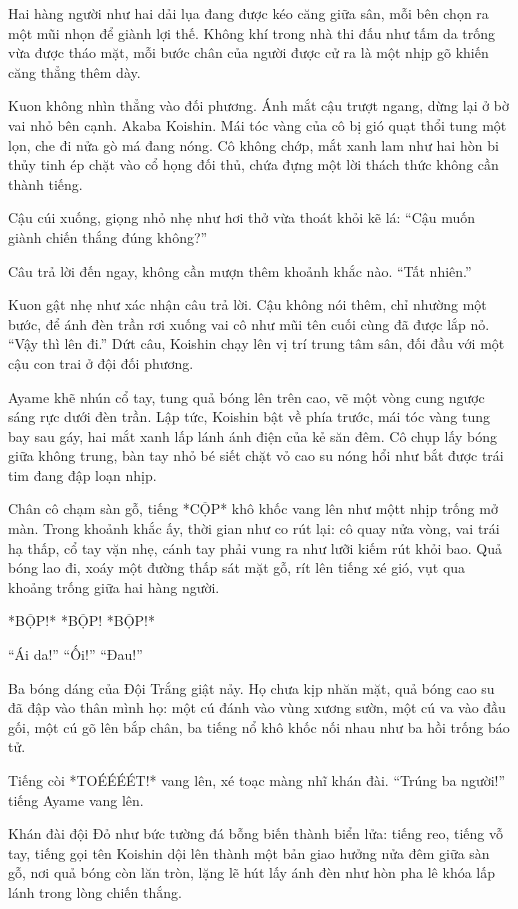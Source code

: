 \documentclass[../main.tex]{subfiles}
\begin{document}
Hai hàng người như hai dải lụa đang được kéo căng giữa sân, mỗi bên chọn ra một mũi nhọn để giành lợi thế. Không khí trong nhà thi đấu như tấm da trống vừa được tháo mặt, mỗi bước chân của người được cử ra là một nhịp gõ khiến căng thẳng thêm dày.

Kuon không nhìn thẳng vào đối phương. Ánh mắt cậu trượt ngang, dừng lại ở bờ vai nhỏ bên cạnh. Akaba Koishin. Mái tóc vàng của cô bị gió quạt thổi tung một lọn, che đi nửa gò má đang nóng. Cô không chớp, mắt xanh lam như hai hòn bi thủy tinh ép chặt vào cổ họng đối thủ, chứa đựng một lời thách thức không cần thành tiếng.

Cậu cúi xuống, giọng nhỏ nhẹ như hơi thở vừa thoát khỏi kẽ lá: ``Cậu muốn giành chiến thắng đúng không?''

Câu trả lời đến ngay, không cần mượn thêm khoảnh khắc nào. ``Tất nhiên.''

Kuon gật nhẹ như xác nhận câu trả lời. Cậu không nói thêm, chỉ nhường một bước, để ánh đèn trần rơi xuống vai cô như mũi tên cuối cùng đã được lắp nỏ. ``Vậy thì lên đi.'' Dứt câu, Koishin chạy lên vị trí trung tâm sân, đối đầu với một cậu con trai ở đội đối phương.

Ayame khẽ nhún cổ tay, tung quả bóng lên trên cao, vẽ một vòng cung ngược sáng rực dưới đèn trần. Lập tức, Koishin bật về phía trước, mái tóc vàng tung bay sau gáy, hai mắt xanh lấp lánh ánh điện của kẻ săn đêm. Cô chụp lấy bóng giữa không trung, bàn tay nhỏ bé siết chặt vỏ cao su nóng hổi như bắt được trái tim đang đập loạn nhịp.

Chân cô chạm sàn gỗ, tiếng *CỘP* khô khốc vang lên như mộtt nhịp trống mở màn. Trong khoảnh khắc ấy, thời gian như co rút lại: cô quay nửa vòng, vai trái hạ thấp, cổ tay vặn nhẹ, cánh tay phải vung ra như lưỡi kiếm rút khỏi bao. Quả bóng lao đi, xoáy một đường thấp sát mặt gỗ, rít lên tiếng xé gió, vụt qua khoảng trống giữa hai hàng người.

*BỘP!* *BỘP! *BỘP!*

``Ái da!'' ``Ối!'' ``Đau!''

Ba bóng dáng của Đội Trắng giật nảy. Họ chưa kịp nhăn mặt, quả bóng cao su đã đập vào thân mình họ: một cú đánh vào vùng xương sườn, một cú va vào đầu gối, một cú gõ lên bắp chân, ba tiếng nổ khô khốc nối nhau như ba hồi trống báo tử.

Tiếng còi *TOÉÉÉÉT!* vang lên, xé toạc màng nhĩ khán đài. ``Trúng ba người!'' tiếng Ayame vang lên.

Khán đài đội Đỏ như bức tường đá bỗng biến thành biển lửa: tiếng reo, tiếng vỗ tay, tiếng gọi tên Koishin dội lên thành một bản giao hưởng nửa đêm giữa sàn gỗ, nơi quả bóng còn lăn tròn, lặng lẽ hút lấy ánh đèn như hòn pha lê khóa lấp lánh trong lòng chiến thắng.
\end{document}
